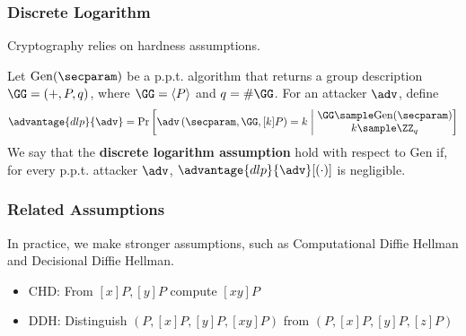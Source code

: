 \documentclass{beamer}
\begin{document}
\begin{frame}
    \frametitle{Discrete Logarithm}
    Cryptography relies on hardness assumptions. 
    \pause
    \begin{definition}
        Let $\mathrm{Gen}(\secparam)$ be a p.p.t. algorithm that returns a group description $\GG = (+, P, q)$, where $\GG = \langle P \rangle$ and $q = \#\GG$.
        For an attacker $\adv$, define 
        \[\advantage{dlp}{\adv} = \Pr\left[\adv\left(\secparam, \GG, [k]P \right) = k \; \middle\vert \; \begin{matrix}
            \GG \sample \mathrm{Gen}(\secparam) \\
            k \sample \ZZ_q
        \end{matrix}
        \right] \]
        We say that the \textbf{discrete logarithm assumption} hold with respect to $\mathrm{Gen}$ if, for every p.p.t. attacker $\adv$, $\advantage{dlp}{\adv}[(\cdot)]$ is negligible.
    \end{definition}
\end{frame}

\begin{frame}
    \frametitle{Related Assumptions}
    In practice, we make stronger assumptions, such as Computational Diffie Hellman and Decisional Diffie Hellman. 
    \pause
    \begin{itemize}
        \item<2-> CHD: From $[x]P, [y]P$ compute $[xy]P$
        \item<3-> DDH: Distinguish $(P, [x]P, [y]P, [xy]P)$ from $(P, [x]P, [y]P, [z]P)$
    \end{itemize}

\end{frame}
\end{document}
